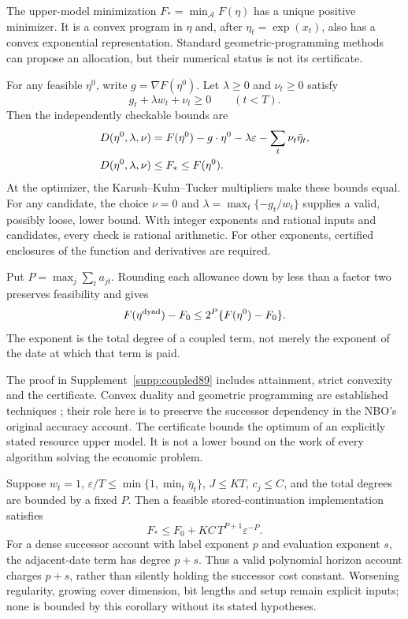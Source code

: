 \begin{theorem}\label{thm:coupled89}
The upper-model minimization $F_* =\min_{\mathcal A}F(\eta)$ has a unique positive minimizer. It is a convex program in $\eta$ and, after $\eta_t=\exp(x_t)$, also has a convex exponential representation. Standard geometric-programming methods can propose an allocation, but their numerical status is not its certificate.

For any feasible $\eta^0$, write $g=\nabla F(\eta^0)$. Let $\lambda\ge0$ and $\nu_t\ge0$ satisfy
\begin{equation}\label{eq:coupled-certificate89}
 g_t+\lambda w_t+\nu_t\ge0\qquad(t<T).
\end{equation}
Then the independently checkable bounds are
\begin{align}\label{eq:coupled-dual89}
 D(\eta^0,\lambda,\nu)
 &=F(\eta^0)-g\cdot\eta^0-\lambda\varepsilon
                  -\sum_t\nu_t\bar\eta_t,\notag\\
 D(\eta^0,\lambda,\nu)&\le F_*\le F(\eta^0).
\end{align}
At the optimizer, the Karush--Kuhn--Tucker multipliers make these bounds equal. For any candidate, the choice $\nu=0$ and
$\lambda=\max_t\{-g_t/w_t\}$ supplies a valid, possibly loose, lower bound. With integer exponents and rational inputs and candidates, every check is rational arithmetic. For other exponents, certified enclosures of the function and derivatives are required.

Put $P=\max_j\sum_ta_{jt}$. Rounding each allowance down by less than a factor two preserves feasibility and gives
\[
 F(\eta^{\rm dyad})-F_0
 \le2^P\{F(\eta^0)-F_0\}.
\]
The exponent is the total degree of a coupled term, not merely the exponent of the date at which that term is paid.
\end{theorem}

The proof in Supplement~\ref{supp:coupled89} includes attainment, strict convexity and the certificate. Convex duality and geometric programming are established techniques \citep{boyd2004,boyd2007gp}; their role here is to preserve the successor dependency in the NBO's original accuracy account. The certificate bounds the optimum of an explicitly stated resource upper model. It is not a lower bound on the work of every algorithm solving the economic problem.

\begin{corollary}\label{cor:coupled-horizon89}
Suppose $w_t=1$, $\varepsilon/T\le\min\{1,\min_t\bar\eta_t\}$, $J\le KT$, $c_j\le C$, and the total degrees are bounded by a fixed $P$. Then a feasible stored-continuation implementation satisfies
\[
 F_*\le F_0+KC\,T^{P+1}\varepsilon^{-P}.
\]
For a dense successor account with label exponent $p$ and evaluation exponent $s$, the adjacent-date term has degree $p+s$. Thus a valid polynomial horizon account charges $p+s$, rather than silently holding the successor cost constant. Worsening regularity, growing cover dimension, bit lengths and setup remain explicit inputs; none is bounded by this corollary without its stated hypotheses.
\end{corollary}

